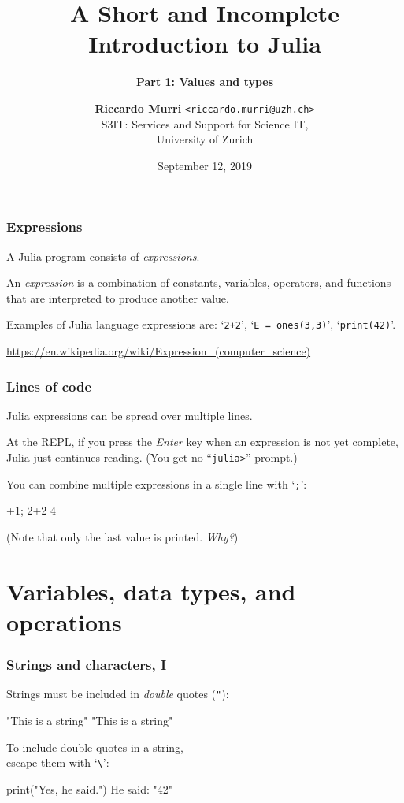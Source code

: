 \documentclass[english,serif,mathserif,xcolor=pdftex,dvipsnames,table]{beamer}
\title[1. Basics]{%
  A Short and Incomplete Introduction to Julia
}
\subtitle{\bfseries Part 1: Values and types}
\author[R.~Murri]{%
  \textbf{Riccardo Murri} \texttt{<riccardo.murri@uzh.ch>}
  \\
  S3IT: Services and Support for Science IT,
  \\
  University of Zurich
}
\date{September 12, 2019}
\begin{document}
\maketitle


\begin{frame}
  \frametitle{Expressions}
  A Julia program consists of \emph{expressions}.

  \+
  An \emph{expression} is a combination of constants, variables,
  operators, and functions that are interpreted to produce another
  value.

  \+
  Examples of Julia language expressions are:
  `\lstinline|2+2|',
  `\lstinline|E = ones(3,3)|',
  `\lstinline|print(42)|'.

  \+
  \begin{references}
    \url{https://en.wikipedia.org/wiki/Expression_(computer_science)}
  \end{references}
\end{frame}

\begin{frame}[fragile]
  \frametitle{Lines of code}
  Julia expressions can be spread over multiple lines.

  \+ At the REPL, if you press the \emph{Enter} key when an expression
  is not yet complete, Julia just continues reading. (You get no
  ``\texttt{julia>}'' prompt.)

  \+ You can combine multiple expressions in a single line with
  `\texttt{;}':
\begin{semiverbatim}
+1; 2+2
4
\end{semiverbatim}

  (Note that only the last value is printed. \emph{Why?})
\end{frame}


\section{Variables, data types, and operations}

\begin{frame}
  \frametitle{Strings and characters, I}
  Strings must be included in \emph{double} quotes (\texttt{"}):
\begin{semiverbatim}
\julia "This is a string"
"This is a string"
\end{semiverbatim}

  \+
  To include double quotes in a string, \\ escape them with `\texttt{\textbackslash}':
\begin{semiverbatim}
\julia print("Yes, he said.")
He said: "42"
\end{semiverbatim}
\end{frame}
\end{document}
